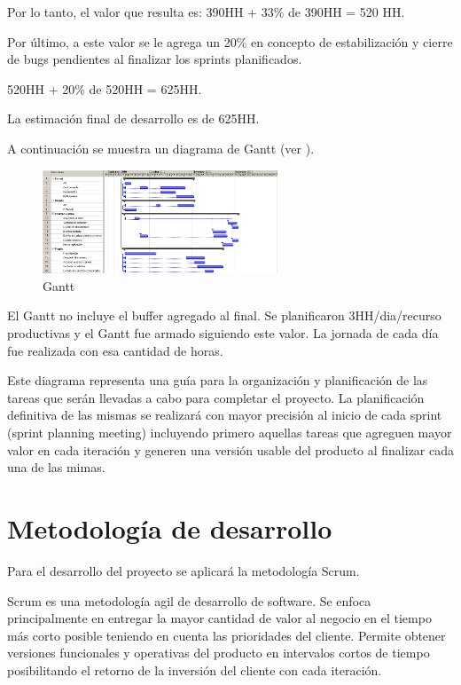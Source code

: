 \documentclass[12pt,a4paper]{article}
\begin{document}
	Por lo tanto, el valor que resulta es: 390HH + 33\% de 390HH = 520 HH.

	Por último, a este valor se le agrega un 20\% en concepto de estabilización y cierre de bugs pendientes al finalizar los sprints planificados.

	520HH + 20\% de 520HH = 625HH.

	La estimación final de desarrollo es de 625HH.

	A continuación se muestra un diagrama de Gantt (ver \cite{gantt}).

	\begin{figure}[H]
		\begin{center}
			\includegraphics[width=7cm]{gantt.png}
			\caption{\label{gantt} Gantt }
		\end{center}
	\end{figure}

	El Gantt no incluye el buffer agregado al final. Se planificaron 3HH/dia/recurso productivas y el Gantt fue armado siguiendo este valor. La jornada de cada día fue realizada con esa cantidad de horas.

	Este diagrama representa una guía para la organización y planificación de las tareas que serán llevadas a cabo para completar el proyecto. La planificación definitiva de las mismas se realizará con mayor precisión al inicio de cada sprint (sprint planning meeting) incluyendo primero aquellas tareas que agreguen mayor valor en cada iteración y generen una versión usable del producto al finalizar cada una de las mimas.

	\section{Metodología de desarrollo}
	
	Para el desarrollo del proyecto se aplicará la metodología Scrum.

	Scrum es una metodología agil de desarrollo de software. Se enfoca principalmente en entregar la mayor cantidad de valor al negocio en el tiempo más corto posible teniendo en cuenta las prioridades del cliente. Permite obtener versiones funcionales y operativas del producto en intervalos cortos de tiempo posibilitando el retorno de la inversión del cliente con cada iteración.
	
\end{document}
